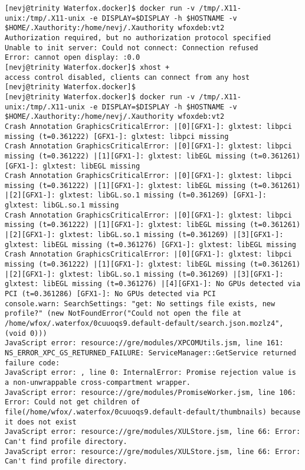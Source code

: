 \documentclass{article}  %
\begin{document}
\begin{verbatim}
[nevj@trinity Waterfox.docker]$ docker run -v /tmp/.X11-unix:/tmp/.X11-unix -e DISPLAY=$DISPLAY -h $HOSTNAME -v $HOME/.Xauthority:/home/nevj/.Xauthority wfoxdeb:vt2
Authorization required, but no authorization protocol specified
Unable to init server: Could not connect: Connection refused
Error: cannot open display: :0.0
[nevj@trinity Waterfox.docker]$ xhost +
access control disabled, clients can connect from any host
[nevj@trinity Waterfox.docker]$ 
[nevj@trinity Waterfox.docker]$ docker run -v /tmp/.X11-unix:/tmp/.X11-unix -e DISPLAY=$DISPLAY -h $HOSTNAME -v $HOME/.Xauthority:/home/nevj/.Xauthority wfoxdeb:vt2
Crash Annotation GraphicsCriticalError: |[0][GFX1-]: glxtest: libpci missing (t=0.361222) [GFX1-]: glxtest: libpci missing
Crash Annotation GraphicsCriticalError: |[0][GFX1-]: glxtest: libpci missing (t=0.361222) |[1][GFX1-]: glxtest: libEGL missing (t=0.361261) [GFX1-]: glxtest: libEGL missing
Crash Annotation GraphicsCriticalError: |[0][GFX1-]: glxtest: libpci missing (t=0.361222) |[1][GFX1-]: glxtest: libEGL missing (t=0.361261) |[2][GFX1-]: glxtest: libGL.so.1 missing (t=0.361269) [GFX1-]: glxtest: libGL.so.1 missing
Crash Annotation GraphicsCriticalError: |[0][GFX1-]: glxtest: libpci missing (t=0.361222) |[1][GFX1-]: glxtest: libEGL missing (t=0.361261) |[2][GFX1-]: glxtest: libGL.so.1 missing (t=0.361269) |[3][GFX1-]: glxtest: libEGL missing (t=0.361276) [GFX1-]: glxtest: libEGL missing
Crash Annotation GraphicsCriticalError: |[0][GFX1-]: glxtest: libpci missing (t=0.361222) |[1][GFX1-]: glxtest: libEGL missing (t=0.361261) |[2][GFX1-]: glxtest: libGL.so.1 missing (t=0.361269) |[3][GFX1-]: glxtest: libEGL missing (t=0.361276) |[4][GFX1-]: No GPUs detected via PCI (t=0.361286) [GFX1-]: No GPUs detected via PCI
console.warn: SearchSettings: "get: No settings file exists, new profile?" (new NotFoundError("Could not open the file at /home/wfox/.waterfox/0cuuoqs9.default-default/search.json.mozlz4", (void 0)))
JavaScript error: resource://gre/modules/XPCOMUtils.jsm, line 161: NS_ERROR_XPC_GS_RETURNED_FAILURE: ServiceManager::GetService returned failure code:
JavaScript error: , line 0: InternalError: Promise rejection value is a non-unwrappable cross-compartment wrapper.
JavaScript error: resource://gre/modules/PromiseWorker.jsm, line 106: Error: Could not get children of file(/home/wfox/.waterfox/0cuuoqs9.default-default/thumbnails) because it does not exist
JavaScript error: resource://gre/modules/XULStore.jsm, line 66: Error: Can't find profile directory.
JavaScript error: resource://gre/modules/XULStore.jsm, line 66: Error: Can't find profile directory.

\end{verbatim}
\end{document}
